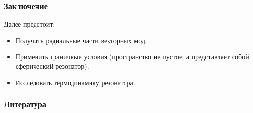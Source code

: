 \documentclass{beamer}
\begin{document}

    \begin{frame}\frametitle{Заключение}

        Далее предстоит:
        \begin{itemize}
            \item Получить радиальные части векторных мод.

            \item Применить граничные условия (пространство не пустое, а представляет собой сферический резонатор).

            \item Исследовать термодинамику резонатора.
        \end{itemize}

    \end{frame}


    \begin{frame}\frametitle{Литература}
        
        
    \end{frame}
\end{document}

